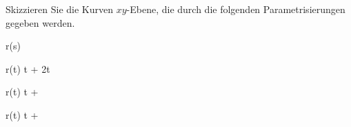 \begin{atiTask}[
  title = Parametrisierung gegeben, Kurve gesucht
]
  Skizzieren Sie die Kurven $xy$-Ebene, die durch die folgenden Parametrisierungen gegeben werden.
  \begin{atiSubequations}
    \item{
      \separate
      r(s)  {}
    }
    \item{
      \separate
      r(t) \cos t  + 2\sin t 
    }
    \item{
      \separate
      r(t)  t + 
    }
    \item{
      \separate
      r(t)  t + 
    }
  \end{atiSubequations}
\end{atiTask}
